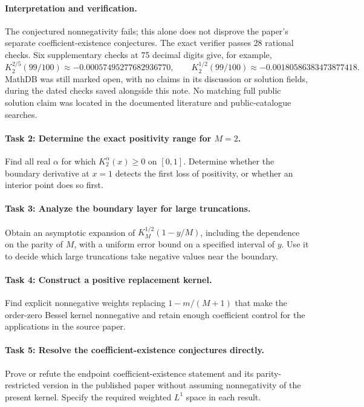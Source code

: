 \documentclass[11pt]{article}
\begin{document}
\paragraph{Interpretation and verification.}
The conjectured nonnegativity fails; this alone does not disprove the
paper's separate coefficient-existence conjectures.
The exact verifier passes 28 rational checks. Six supplementary checks
at 75 decimal digits give, for example,
\[
 K_2^{2/5}(99/100)\approx-0.00057495277682936770,\qquad
 K_2^{1/2}(99/100)\approx-0.00180586383473877418.
\]
MathDB was still marked open, with no claims in its discussion or
solution fields, during the dated checks saved alongside this note.
No matching full public solution claim was located in the documented
literature and public-catalogue searches.

\paragraph{Task 2: Determine the exact positivity range for \(M=2\).}
Find all real \(\alpha\) for which \(K_2^\alpha(x)\ge0\) on \([0,1]\).
Determine whether the boundary derivative at \(x=1\) detects the
first loss of positivity, or whether an interior point does so first.

\paragraph{Task 3: Analyze the boundary layer for large truncations.}
Obtain an asymptotic expansion of \(K_M^{1/2}(1-y/M)\), including
the dependence on the parity of \(M\), with a uniform error bound
on a specified interval of \(y\). Use it to decide which large
truncations take negative values near the boundary.

\paragraph{Task 4: Construct a positive replacement kernel.}
Find explicit nonnegative weights replacing \(1-m/(M+1)\) that
make the order-zero Bessel kernel nonnegative and retain enough
coefficient control for the applications in the source paper.

\paragraph{Task 5: Resolve the coefficient-existence conjectures directly.}
Prove or refute the endpoint coefficient-existence statement and
its parity-restricted version in the published paper without
assuming nonnegativity of the present kernel. Specify the required
weighted \(L^1\) space in each result.
\end{document}
